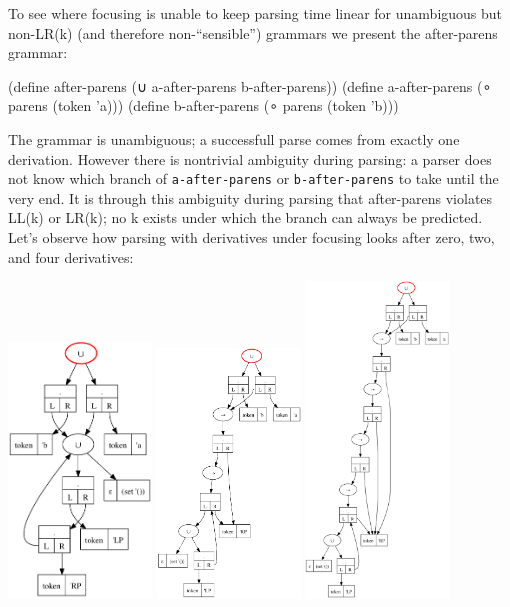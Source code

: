 To see where focusing is unable to keep parsing time linear for unambiguous but
non-LR(k) (and therefore non-``sensible'') grammars we present
the after-parens grammar:
\begin{code}
  (define after-parens
    (∪ a-after-parens b-after-parens))
  (define a-after-parens (∘ parens (token 'a)))
  (define b-after-parens (∘ parens (token 'b)))
\end{code}
%
The grammar is unambiguous; a successfull parse comes from exactly one
derivation.
%
However there is nontrivial ambiguity during parsing: a parser does not know which
branch of {\tt a-after-parens} or {\tt b-after-parens} to take until the very end.
%
It is through this ambiguity during parsing that after-parens violates LL(k) or
LR(k); no k exists under which the branch can always be predicted.
%
Let's observe how parsing with derivatives under focusing looks after zero, two,
and four derivatives:
%
\begin{center}
 \includegraphics[width=1.5in]{after-parens-step-0-f.png}
 \includegraphics[width=1.5in]{after-parens-step-2-f.png}
 \includegraphics[width=1.5in]{after-parens-step-4-f.png}
\end{center}
